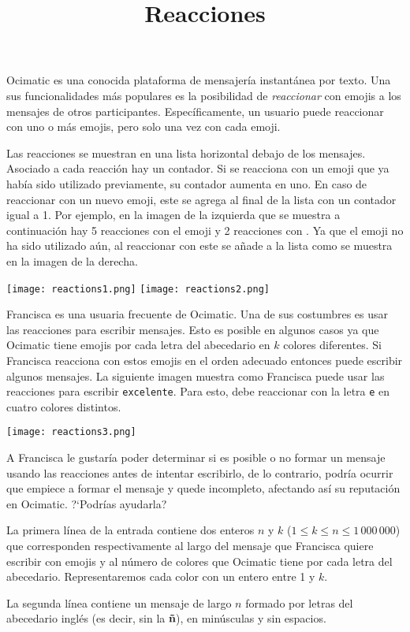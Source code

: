 \documentclass{oci}
\title{Reacciones}
\newcommand{\thumbsup}{\raisebox{-0.1em}{\texttt{[image: thumbsup.png]}}}
\newcommand{\onehundred}{\raisebox{-0.1em}{\texttt{[image: 100.png]}}}
\newcommand{\fire}{\raisebox{-0.1em}{\texttt{[image: fire.png]}}}
\newcommand{\platform}{Ocimatic}
\newcommand{\hero}{Francisca}
\begin{document}
\begin{problemDescription}
\platform{} es una conocida plataforma de mensajería instantánea
por texto.
%
Una sus funcionalidades más populares es la posibilidad de \emph{reaccionar}
con emojis a los mensajes de otros participantes.
%
Específicamente, un usuario puede reaccionar con uno o más emojis,
pero solo una vez con cada emoji.

Las reacciones se muestran en una lista horizontal
debajo de los mensajes.
%
Asociado a cada reacción hay un contador.
%
Si se reacciona con un emoji que ya había sido utilizado previamente,
su contador aumenta en uno.
%
En caso de reaccionar con un nuevo emoji, este se agrega al final de la lista con
un contador igual a 1.
%
Por ejemplo, en la imagen de la izquierda que se muestra
a continuación hay 5 reacciones con el emoji \thumbsup{} y 2 reacciones
con \onehundred{}.
%
Ya que el emoji \fire{} no ha sido utilizado aún, al reaccionar con este
se añade a la lista como se muestra en la imagen de la derecha.
\begin{center}
\texttt{[image: reactions1.png]}
\hspace{6em}
\texttt{[image: reactions2.png]}
\end{center}

\hero{} es una usuaria frecuente de \platform{}.
%
Una de sus costumbres es usar las reacciones para
escribir mensajes.
%
Esto es posible en algunos casos ya que \platform{}
tiene emojis por cada letra del abecedario en $k$ colores diferentes.
%
Si \hero{} reacciona con estos emojis en el orden adecuado
entonces puede escribir algunos mensajes.
%
La siguiente imagen muestra como \hero{} puede usar las reacciones para
escribir \texttt{excelente}.
%
Para esto, debe reaccionar con la letra \texttt{e} en cuatro colores distintos.
%
\begin{center}
  \texttt{[image: reactions3.png]}
\end{center}

A \hero{} le gustaría poder determinar si es posible o no formar un mensaje
usando las reacciones antes de intentar escribirlo, de lo contrario,
podría ocurrir que empiece a formar el mensaje y quede incompleto, afectando
así su reputación en \platform{}.
%
?`Podrías ayudarla?

\end{problemDescription}

\begin{inputDescription}
La primera línea de la entrada contiene dos enteros $n$ y $k$ ($1 \le k \le n \le 1\,000\,000$)
que corresponden respectivamente al largo del mensaje que \hero{} quiere escribir
con emojis y al número de colores que \platform{} tiene por cada letra del abecedario.
%
Representaremos cada color con un entero entre 1 y $k$.

La segunda línea contiene un mensaje de largo $n$ formado por letras del abecedario
inglés (es decir, sin la \textbf{ñ}), en minúsculas y sin espacios.
\end{inputDescription}
\end{document}
